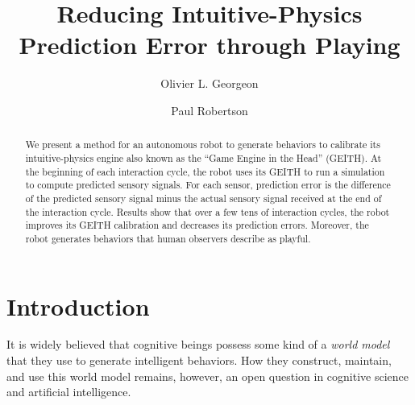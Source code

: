 \documentclass[runningheads]{llncs}
\begin{document}
%
\title{Reducing Intuitive-Physics Prediction Error through Playing}
%
%
\author{Olivier L. Georgeon \and
Paul Robertson }
%
%
%
\maketitle              %
%
\begin{abstract}
We present a method for an autonomous robot to generate behaviors to calibrate its intuitive-physics engine also known as the ``Game Engine in the Head'' (GEITH).
At the beginning of each interaction cycle, the robot uses its GEITH to run a simulation to compute predicted sensory signals. 
For each sensor, prediction error is the difference of the predicted sensory signal minus the actual sensory signal received at the end of the interaction cycle. 
Results show that over a few tens of interaction cycles, the robot improves its GEITH calibration and decreases its prediction errors. 
Moreover, the robot generates behaviors that human observers describe as playful.

\end{abstract}
%
%
%
\section{Introduction}
\label{sec:intro}

It is widely believed that cognitive beings possess some kind of a \textit{world model} that they use to generate intelligent behaviors.
How they construct, maintain, and use this world model remains, however,  an open question in cognitive science and artificial intelligence. 
\end{document}
